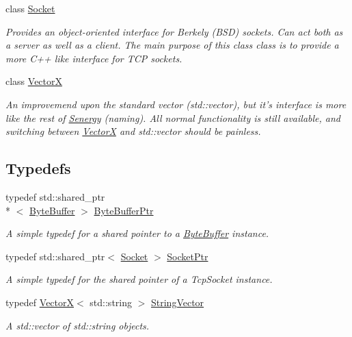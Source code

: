 \begin{DoxyCompactItemize}
class \hyperlink{class_senergy_1_1_socket}{Socket}
\begin{DoxyCompactList}\small\item\em Provides an object-\/oriented interface for Berkely (B\-S\-D) sockets. Can act both as a server as well as a client. The main purpose of this class class is to provide a more C++ like interface for T\-C\-P sockets. \end{DoxyCompactList}\item 
class \hyperlink{class_senergy_1_1_vector_x}{Vector\-X}
\begin{DoxyCompactList}\small\item\em An improvemend upon the standard vector (std\-::vector), but it's interface is more like the rest of \hyperlink{namespace_senergy}{Senergy} (naming). All normal functionality is still available, and switching between \hyperlink{class_senergy_1_1_vector_x}{Vector\-X} and std\-::vector should be painless. \end{DoxyCompactList}\end{DoxyCompactItemize}
\subsection*{Typedefs}
\begin{DoxyCompactItemize}
\item 
typedef std\-::shared\-\_\-ptr\\*
$<$ \hyperlink{class_senergy_1_1_byte_buffer}{Byte\-Buffer} $>$ \hyperlink{namespace_senergy_a30f5cfaeb333ffdf2c3332cc590a57ea}{Byte\-Buffer\-Ptr}
\begin{DoxyCompactList}\small\item\em A simple typedef for a shared pointer to a \hyperlink{class_senergy_1_1_byte_buffer}{Byte\-Buffer} instance. \end{DoxyCompactList}\item 
typedef std\-::shared\-\_\-ptr$<$ \hyperlink{class_senergy_1_1_socket}{Socket} $>$ \hyperlink{namespace_senergy_a9014e48a368555ba932efd8d17eb2d23}{Socket\-Ptr}
\begin{DoxyCompactList}\small\item\em A simple typedef for the shared pointer of a Tcp\-Socket instance. \end{DoxyCompactList}\item 
typedef \hyperlink{class_senergy_1_1_vector_x}{Vector\-X}$<$ std\-::string $>$ \hyperlink{namespace_senergy_a09aea2e19671645414361ca8388aebfe}{String\-Vector}
\begin{DoxyCompactList}\small\item\em A std\-::vector of std\-::string objects. \end{DoxyCompactList}\end{DoxyCompactItemize}
